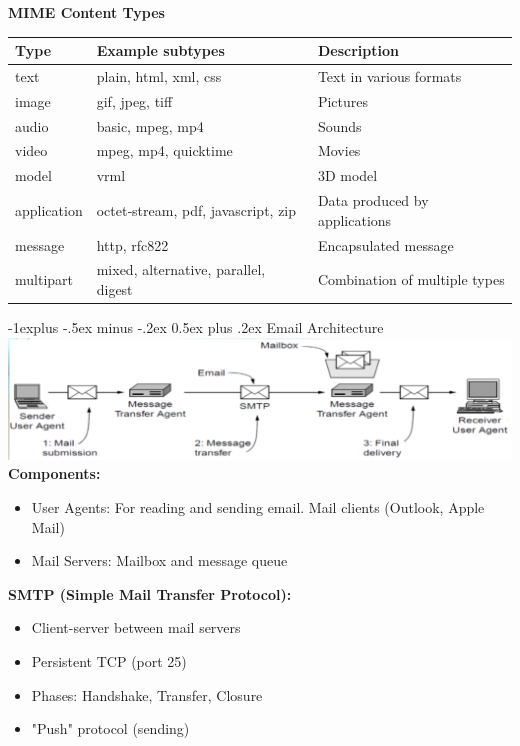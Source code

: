\documentclass[letterpaper, 8pt]{extarticle}
\makeatletter
\renewcommand{\subsection}{\@startsection{subsection}{2}{0mm}%
                                {-1explus -.5ex minus -.2ex}%
                                {0.5ex plus .2ex}%
                                {\normalfont\small\bfseries}}
\makeatother
\begin{document}
\begin{multicols*}{4}
	\textbf{MIME Content Types}

	{\renewcommand{\arraystretch}{12}%
		\begin{tabulary}{\linewidth}{@{}LLL@{}} \toprule
			\textbf{Type} & \textbf{Example subtypes} & \textbf{Description} \\ \midrule
			text        & plain, html, xml, css                     & Text in various formats \\
			image       & gif, jpeg, tiff                           & Pictures \\
			audio       & basic, mpeg, mp4                          & Sounds \\
			video       & mpeg, mp4, quicktime                      & Movies \\
			model       & vrml                                      & 3D model \\
			application & octet‑stream, pdf, javascript, zip        & Data produced by applications \\
			message     & http, rfc822                              & Encapsulated message \\
			multipart   & mixed, alternative, parallel, digest      & Combination of multiple types \\
			\bottomrule
		\end{tabulary}
	}




	\subsection{Email Architecture}
	\includegraphics[width=\linewidth]{SCR-20250417-bixw.png}
	\textbf{Components:}
	\begin{itemize}
		\item User Agents: For reading and sending email. Mail clients (Outlook, Apple Mail)
		\item Mail Servers: Mailbox and message queue
	\end{itemize}

	\textbf{SMTP (Simple Mail Transfer Protocol):}
	\begin{itemize}
		\item Client-server between mail servers
		\item Persistent TCP (port 25)
		\item Phases: Handshake, Transfer, Closure
		\item "Push" protocol (sending)
	\end{itemize}


\end{multicols*}
\end{document}
